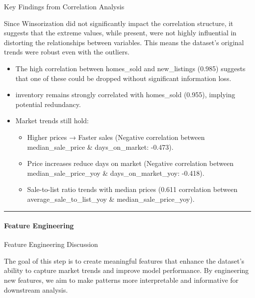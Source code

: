 \documentclass[11pt]{article}
\providecommand{\tightlist}{%
      \setlength{\itemsep}{0pt}\setlength{\parskip}{0pt}}
\begin{document}
    Key Findings from Correlation Analysis

Since Winsorization did not significantly impact the correlation
structure, it suggests that the extreme values, while present, were not
highly influential in distorting the relationships between variables.
This means the dataset's original trends were robust even with the
outliers.

\begin{itemize}
\tightlist
\item
  The high correlation between homes\_sold and new\_listings (0.985)
  suggests that one of these could be dropped without significant
  information loss.
\item
  inventory remains strongly correlated with homes\_sold (0.955),
  implying potential redundancy.
\item
  Market trends still hold:

  \begin{itemize}
  \tightlist
  \item
    Higher prices → Faster sales (Negative correlation between
    median\_sale\_price \& days\_on\_market: -0.473).
  \item
    Price increases reduce days on market (Negative correlation between
    median\_sale\_price\_yoy \& days\_on\_market\_yoy: -0.418).
  \item
    Sale-to-list ratio trends with median prices (0.611 correlation
    between average\_sale\_to\_list\_yoy \& median\_sale\_price\_yoy).
  \end{itemize}
\end{itemize}

\begin{center}\rule{0.5\linewidth}{0.5pt}\end{center}

    \paragraph{Feature Engineering}\label{feature-engineering}

    Feature Engineering Discussion

The goal of this step is to create meaningful features that enhance the
dataset's ability to capture market trends and improve model
performance. By engineering new features, we aim to make patterns more
interpretable and informative for downstream analysis.
\end{document}

